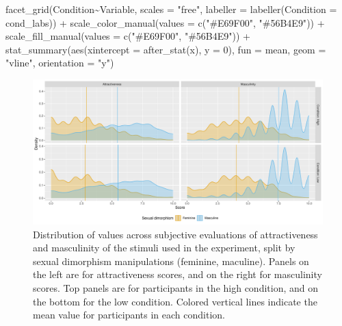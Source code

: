 \documentclass[
  bookmarksnumbered]{article}
\newenvironment{Shaded}{\begin{snugshade}}{\end{snugshade}}
\newcommand{\AttributeTok}[1]{\textcolor[rgb]{0.80,0.80,0.80}{#1}}
\newcommand{\DecValTok}[1]{\textcolor[rgb]{0.86,0.86,0.80}{#1}}
\newcommand{\FunctionTok}[1]{\textcolor[rgb]{0.94,0.94,0.56}{#1}}
\newcommand{\NormalTok}[1]{\textcolor[rgb]{0.80,0.80,0.80}{#1}}
\newcommand{\SpecialCharTok}[1]{\textcolor[rgb]{0.86,0.64,0.64}{#1}}
\newcommand{\StringTok}[1]{\textcolor[rgb]{0.80,0.58,0.58}{#1}}
\begin{document}
\begin{Shaded}
\begin{Highlighting}[]
  \FunctionTok{facet\_grid}\NormalTok{(Condition}\SpecialCharTok{\textasciitilde{}}\NormalTok{Variable, }\AttributeTok{scales =} \StringTok{"free"}\NormalTok{,}
             \AttributeTok{labeller =} \FunctionTok{labeller}\NormalTok{(}\AttributeTok{Condition =}\NormalTok{ cond\_labs)) }\SpecialCharTok{+}
  \FunctionTok{scale\_color\_manual}\NormalTok{(}\AttributeTok{values =} \FunctionTok{c}\NormalTok{(}\StringTok{"\#E69F00"}\NormalTok{, }\StringTok{"\#56B4E9"}\NormalTok{)) }\SpecialCharTok{+}
  \FunctionTok{scale\_fill\_manual}\NormalTok{(}\AttributeTok{values =} \FunctionTok{c}\NormalTok{(}\StringTok{"\#E69F00"}\NormalTok{, }\StringTok{"\#56B4E9"}\NormalTok{)) }\SpecialCharTok{+}
  \FunctionTok{stat\_summary}\NormalTok{(}\FunctionTok{aes}\NormalTok{(}\AttributeTok{xintercept =} \FunctionTok{after\_stat}\NormalTok{(x), }\AttributeTok{y =} \DecValTok{0}\NormalTok{),}
               \AttributeTok{fun =}\NormalTok{ mean, }\AttributeTok{geom =} \StringTok{"vline"}\NormalTok{, }\AttributeTok{orientation =} \StringTok{"y"}\NormalTok{)}
\end{Highlighting}
\end{Shaded}

\begin{figure}
\centering
\includegraphics{Supplementary_material_files/figure-latex/stimuli-eval-desc-plot-1.pdf}
\caption{\label{fig:stimuli-eval-desc-plot}Distribution of values across subjective evaluations of attractiveness and masculinity of the stimuli used in the experiment, split by sexual dimorphism manipulations (feminine, maculine). Panels on the left are for attractiveness scores, and on the right for masculinity scores. Top panels are for participants in the high condition, and on the bottom for the low condition. Colored vertical lines indicate the mean value for participants in each condition.}
\end{figure}
\end{document}

